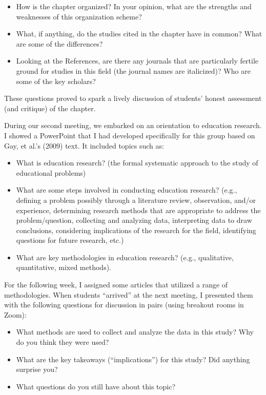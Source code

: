 \documentclass[11.5pt]{sig-alternate}
\begin{document}
\begin{large}
\begin{itemize}
    \item How is the chapter organized?  In your opinion, what are the strengths and weaknesses of this organization scheme?
    \item What, if anything, do the studies cited in the chapter have in common?  What are some of the differences?
    \item Looking at the References, are there any journals that are particularly fertile ground for studies in this field (the journal names are italicized)?  Who are some of the key scholars?
\end{itemize}

These questions proved to spark a lively discussion of students’ honest assessment (and critique) of the chapter.  

During our second meeting, we embarked on an orientation to education research.  I showed a PowerPoint that I had developed specifically for this group based on Gay, et al.’s (2009) text.  It included topics such as: 

\begin{itemize}
    \item What is education research? (the formal systematic approach to the study of educational problems)
    \item What are some steps involved in conducting education research? (e.g., defining a problem possibly through a literature review, observation, and/or experience, determining research methods that are appropriate to address the problem/question, collecting and analyzing data, interpreting data to draw conclusions, considering implications of the research for the field, identifying questions for future research, etc.)
    \item What are key methodologies in education research? (e.g., qualitative, quantitative, mixed methods).
\end{itemize}

For the following week, I assigned some articles that utilized a range of methodologies.  When students “arrived” at the next meeting, I presented them with the following questions for discussion in pairs (using breakout rooms in Zoom): 

\begin{itemize}
    \item What methods are used to collect and analyze the data in this study?  Why do you think they were used?
    \item What are the key takeaways (“implications”) for this study?  Did anything surprise you?
    \item What questions do you still have about this topic?
\end{itemize}


\end{large}
\end{document}
